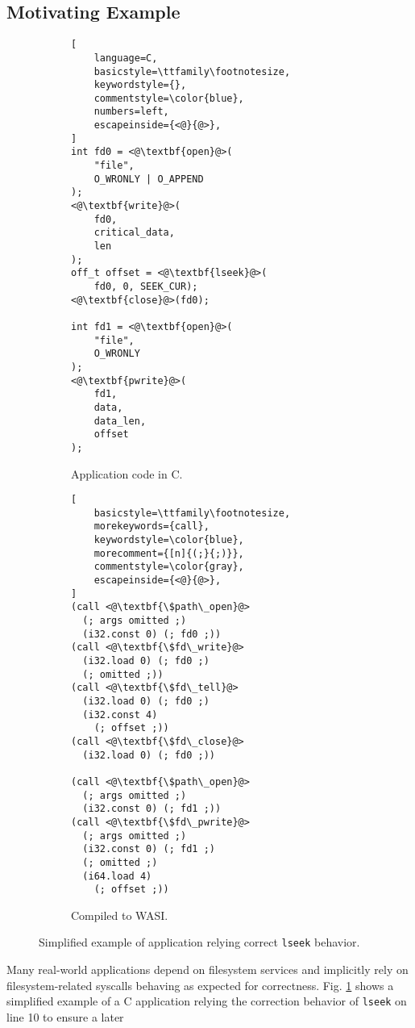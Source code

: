 \subsection{Motivating Example}
%
\begin{figure}
\begin{subfigure}{0.23\textwidth}
\begin{lstlisting}[
    language=C,
    basicstyle=\ttfamily\footnotesize,
    keywordstyle={},
    commentstyle=\color{blue},
    numbers=left,
    escapeinside={<@}{@>},
]
int fd0 = <@\textbf{open}@>(
    "file",
    O_WRONLY | O_APPEND
);
<@\textbf{write}@>(
    fd0,
    critical_data,
    len
);
off_t offset = <@\textbf{lseek}@>(
    fd0, 0, SEEK_CUR);
<@\textbf{close}@>(fd0);

int fd1 = <@\textbf{open}@>(
    "file",
    O_WRONLY
);
<@\textbf{pwrite}@>(
    fd1,
    data,
    data_len,
    offset
);
\end{lstlisting}
\caption{Application code in C.}
\label{fig:lseek-example-c}
\end{subfigure}%
%
\begin{subfigure}{0.25\textwidth}
\begin{lstlisting}[
    basicstyle=\ttfamily\footnotesize,
    morekeywords={call},
    keywordstyle=\color{blue},
    morecomment={[n]{(;}{;)}},
    commentstyle=\color{gray},
    escapeinside={<@}{@>},
]
(call <@\textbf{\$path\_open}@>
  (; args omitted ;)
  (i32.const 0) (; fd0 ;))
(call <@\textbf{\$fd\_write}@>
  (i32.load 0) (; fd0 ;)
  (; omitted ;))
(call <@\textbf{\$fd\_tell}@>
  (i32.load 0) (; fd0 ;)
  (i32.const 4)
    (; offset ;))
(call <@\textbf{\$fd\_close}@>
  (i32.load 0) (; fd0 ;))

(call <@\textbf{\$path\_open}@>
  (; args omitted ;)
  (i32.const 0) (; fd1 ;))
(call <@\textbf{\$fd\_pwrite}@>
  (; args omitted ;)
  (i32.const 0) (; fd1 ;)
  (; omitted ;)
  (i64.load 4)
    (; offset ;))
\end{lstlisting}
\caption{Compiled to WASI.}
\label{fig:lseek-example-wasm}
\end{subfigure}%
%
\caption{Simplified example of application relying correct \texttt{lseek} behavior.}
\label{fig:lseek-example}
\end{figure}
%
Many real-world applications depend on filesystem services and implicitly rely
on filesystem-related syscalls behaving as expected for correctness.
%
Fig. \ref{fig:lseek-example-c} shows a simplified example of a C application
relying the correction behavior of \texttt{lseek} on line 10 to ensure a later
